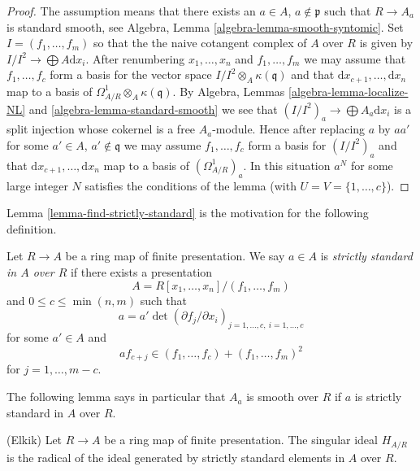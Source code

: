 \begin{proof}
The assumption means that there exists an $a \in A$, $a \not \in \mathfrak p$
such that $R \to A_a$ is standard smooth, see
Algebra, Lemma \ref{algebra-lemma-smooth-syntomic}.
Set $I = (f_1, \ldots, f_m)$ so that the the naive cotangent
complex of $A$ over $R$ is given by $I/I^2 \to \bigoplus A\text{d}x_i$.
After renumbering $x_1, \ldots, x_n$ and $f_1, \ldots, f_m$ we may assume
that $f_1, \ldots, f_c$ form a basis for the vector space
$I/I^2 \otimes_A \kappa(\mathfrak q)$ and that
$\text{d}x_{c + 1}, \ldots, \text{d}x_n$ map to a basis of
$\Omega^1_{A/R} \otimes_A \kappa(\mathfrak q)$. By
Algebra, Lemmas \ref{algebra-lemma-localize-NL} and
\ref{algebra-lemma-standard-smooth}
we see that $(I/I^2)_a \to \bigoplus A_a\text{d}x_i$ is a split injection
whose cokernel is a free $A_a$-module. Hence after replacing $a$ by $aa'$ for
some $a' \in A$, $a' \not \in \mathfrak q$ we may assume
$f_1, \ldots, f_c$ form a basis for $(I/I^2)_a$ and that
$\text{d}x_{c + 1}, \ldots, \text{d}x_n$ map to a basis of
$(\Omega^1_{A/R})_a$. In this situation $a^N$ for some large integer
$N$ satisfies the conditions of the
lemma (with $U = V = \{1, \ldots, c\}$).
\end{proof}

\noindent
Lemma \ref{lemma-find-strictly-standard}
is the motivation for the following definition.

\begin{definition}
\label{definition-strictly-standard}
Let $R \to A$ be a ring map of finite presentation.
We say $a \in A$ is {\it strictly standard in $A$ over $R$}
if there exists a presentation
$$
A = R[x_1, \ldots, x_n]/(f_1, \ldots, f_m)
$$
and $0 \leq c \leq \min(n, m)$ such that
\begin{equation}
\label{equation-standard-one}
a = a' \det(\partial f_j/\partial x_i)_{j = 1, \ldots, c, \ i = 1, \ldots, c}
\end{equation}
for some $a' \in A$ and
\begin{equation}
\label{equation-standard-two}
a f_{c + j} \in (f_1, \ldots, f_c) + (f_1, \ldots, f_m)^2
\end{equation}
for $j = 1, \ldots, m - c$.
\end{definition}

\noindent
The following lemma says in particular that $A_a$ is smooth
over $R$ if $a$ is strictly standard in $A$ over $R$.

\begin{lemma}
\label{lemma-elkik}
(Elkik) Let $R \to A$ be a ring map of finite presentation.
The singular ideal $H_{A/R}$ is the radical of the ideal
generated by strictly standard elements in $A$ over $R$.
\end{lemma}

